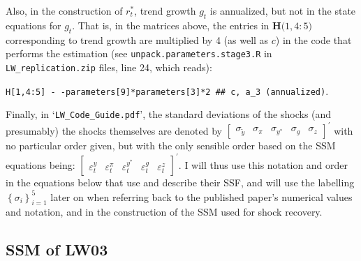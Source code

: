 \documentclass[a4paper,12pt]{article}
\begin{document}
Also, in the construction of $r_{t}^{\ast }$, trend growth $g_{t}$ is
annualized, but not in the state equations for $g_{t}$. That is, in the
matrices above, the entries in $\mathbf{H(}1,4:5\mathbf{)}$ corresponding to
trend growth are multiplied by 4 (as well as $c$) in the code that performs
the estimation (see \texttt{unpack.parameters.stage3.R} in \texttt{%
LW\_replication.zip} files, line 24, which reads):\

\texttt{H[1,4:5] \TEXTsymbol{<}- -parameters[9]*parameters[3]*2 \#\# c, a\_3
(annualized)}.

\noindent Finally, in `\texttt{LW\_Code\_Guide.pdf}', the standard
deviations of the shocks (and presumably) the shocks themselves are denoted
by $%
\begin{bmatrix}
\sigma _{\tilde{y}} & \sigma _{\pi } & \sigma _{y^{\ast }} & \sigma _{g} &
\sigma _{z}%
\end{bmatrix}%
^{\prime }$ with no particular order given, but with the only sensible order
based on the SSM equations being: $%
\begin{bmatrix}
\varepsilon _{t}^{y} & \varepsilon _{t}^{\pi } & \varepsilon _{t}^{y^{\ast }}
& \varepsilon _{t}^{g} & \varepsilon _{t}^{z}%
\end{bmatrix}%
^{\prime }$. I will thus use this notation and order in the equations below
that use and describe their SSF, and will use the labelling $\left\{ \sigma
_{i}\right\} _{i=1}^{5}$ later on when referring back to the published
paper's numerical values and notation, and in the construction of the SSM
used for shock recovery.

\pagebreak

\subsection{SSM of LW03}
\end{document}
